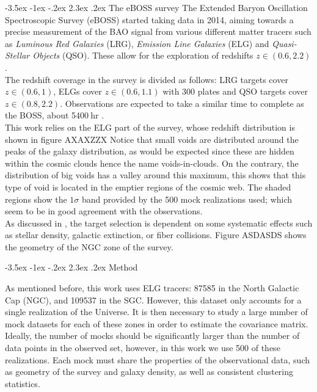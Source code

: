 \documentclass[a4paper,12pt,twoside]{article}
\makeatletter
\renewcommand{\section}{\@startsection {section}{1}{\z@}%
             {-3.5ex \@plus -1ex \@minus -.2ex}%
             {2.3ex \@plus.2ex}%
             {\normalfont\large\bfseries}}
\renewcommand{\subsection}{\@startsection {subsection}{1}{\z@}%
             {-3.5ex \@plus -1ex \@minus -.2ex}%
             {2.3ex \@plus.2ex}%
             {\normalfont\normalsize\bfseries}}
\makeatother
\begin{document}
\subsection{The eBOSS survey\label{sec:survey}}
The Extended Baryon Oscillation Spectroscopic Survey (eBOSS) started taking data in 2014, aiming towards a precise measurement of the BAO signal from various different matter tracers such as \textit{Luminous Red Galaxies} (LRG), \textit{Emission Line Galaxies} (ELG) and \textit{Quasi-Stellar Objects} (QSO). These allow for the exploration of redshifts $z\in (0.6, 2.2)$ \citep{Dawson2015}.\\
The redshift coverage in the survey is divided as follows: LRG targets cover $z \in (0.6, 1)$, ELGs cover $z \in (0.6, 1.1)$ with 300 plates and QSO targets cover $z \in(0.8, 2.2)$. Observations are expected to take a similar time to complete as the BOSS, about 5400$~$hr \citep{Dawson2015}.\\
This work relies on the ELG part of the survey, whose redshift distribution is shown in figure AXAXZZX
Notice that small voids are distributed around the peaks of the galaxy distribution, as would be expected since these are hidden within the cosmic clouds hence the name voids-in-clouds. On the contrary, the distribution of big voids has a valley around this maximum, this shows that this type of void is located in the emptier regions of the cosmic web. The shaded regions show the $1\sigma$ band provided by the 500 mock realizations used; which seem to be in good agreement with the observations.\\
As discussed in \textcite{Raichoor2017}, the target selection is dependent on some systematic effects such as stellar density, galactic extinction, or fiber collisions. Figure ASDASDS shows the geometry of the NGC zone of the survey.

\section{Method\label{sec:method}}

As mentioned before, this work uses ELG tracers: 87585 in the North Galactic Cap (NGC), and 109537 in the SGC. However, this dataset only accounts for a single realization of the Universe. It is then necessary to study a large number of mock datasets for each of these zones in order to estimate the covariance matrix. Ideally, the number of mocks should be significantly larger than the number of data points in the observed set, however, in this work we use 500 of these realizations. Each mock must share the properties of the observational data, such as geometry of the survey and galaxy density, as well as consistent clustering statistics.\\
\end{document}
